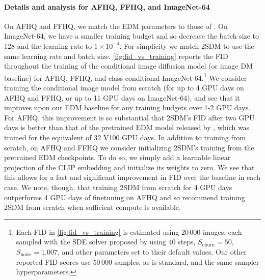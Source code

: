 \paragraph{Details and analysis for AFHQ, FFHQ, and ImageNet-64}
On AFHQ and FFHQ, we match the EDM parameters to those of \citet{karras2022elucidating}. On ImageNet-64, we have a smaller training budget and so decrease the batch size to 128 and the learning rate to $1\times10^{-4}$. For simplicity we match 2SDM to use the same learning rate and batch size. \cref{fig:fid_vs_training} reports the FID throughout the training of the conditional image diffusion model (or image DM baseline) for AFHQ, FFHQ, and class-conditional ImageNet-64.\footnote{Each FID in \cref{fig:fid_vs_training} is estimated using $20\,000$ images, each sampled with the SDE solver proposed by \citet{karras2022elucidating} using 40 steps, $S_\text{churn}=50$, $S_\text{noise}=1.007$, and other parameters set to their default values. Our other reported FID scores use $50\,000$ samples, as is standard, and the same sampler hyperparameters.}  We consider training the conditional image model from scratch (for up to 4 GPU days on AFHQ and FFHQ, or up to 11 GPU days on ImageNet-64), and see that it improves upon our EDM baseline for any training budgets over 1-2 GPU days. For AFHQ, this improvement is so substantial that 2SDM's FID after two GPU days is better than that of the pretrained EDM model released by \citet{karras2022elucidating}, which was trained for the equivalent of 32 V100 GPU days. In addition to training from scratch, on AFHQ and FFHQ we consider initializing 2SDM's training from the pretrained EDM checkpoints. To do so, we simply add a learnable linear projection of the CLIP embedding and initialize its weights to zero. We see that this allows for a fast and significant improvement in FID over the baseline in each case. We note, though, that training 2SDM from scratch for 4 GPU days outperforms 4 GPU days of finetuning on AFHQ and so recommend training 2SDM from scratch when sufficient compute is available.

